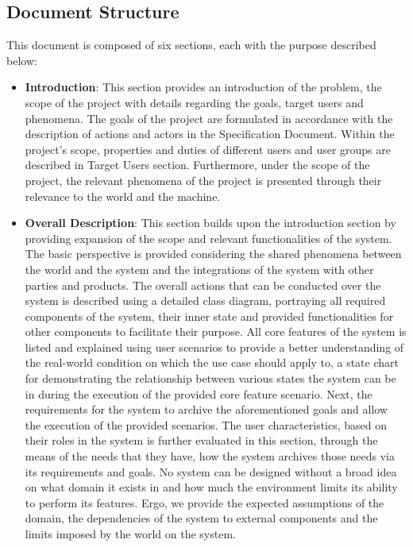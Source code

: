 \subsection{Document Structure}
This document is composed of six sections, each with the purpose described below: \\
\begin{itemize}
    \item \textbf{Introduction}: This section provides an introduction of the problem, the scope of the project with details regarding the goals, target users and phenomena.
        The goals of the project are formulated in accordance with the description of actions and actors in the Specification Document.
        Within the project's scope, properties and duties of different users and user groups are described in Target Users section.
        Furthermore, under the scope of the project, the relevant phenomena of the project is presented through their relevance to the world and the machine.
    \item \textbf{Overall Description}: This section builds upon the introduction section by providing expansion of the scope and relevant functionalities of the system.
        The basic perspective is provided considering the shared phenomena between the world and the system and the integrations of the system with other parties and products.
        The overall actions that can be conducted over the system is described using a detailed class diagram, portraying all required components of the system, their inner state and provided functionalities for other components to facilitate their purpose.
        All core features of the system is listed and explained using user scenarios to provide a better understanding of the real-world condition on which the use case should apply to, a state chart for demonstrating the relationship between various states the system can be in during the execution of the provided core feature scenario.
        Next, the requirements for the system to archive the aforementioned goals and allow the execution of the provided scenarios.
        The user characteristics, based on their roles in the system is further evaluated in this section, through the means of the needs that they have, how the system archives those needs via its requirements and goals.
        No system can be designed without a broad idea on what domain it exists in and how much the environment limits its ability to perform its features.
        Ergo, we provide the expected assumptions of the domain, the dependencies of the system to external components and the limits imposed by the world on the system.

\end{itemize}

